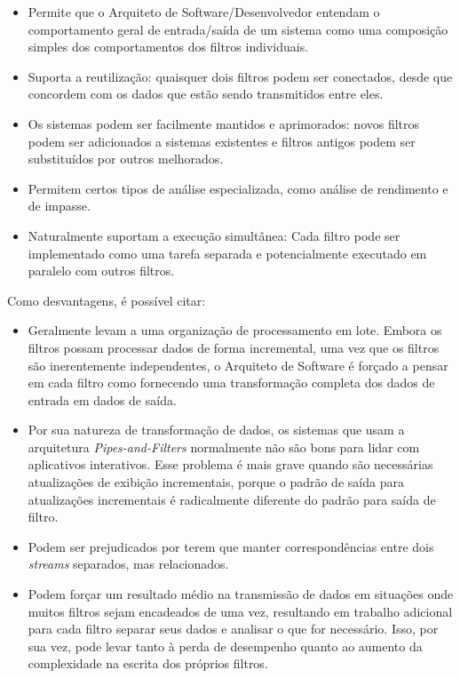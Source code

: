 \documentclass[portugues]{ic-tese}
\begin{document}
\begin{itemize}
\item Permite que o Arquiteto de Software/Desenvolvedor entendam o comportamento geral de entrada/saída de um sistema como uma composição simples dos comportamentos dos filtros individuais.
\item Suporta a reutilização: quaisquer dois filtros podem ser conectados, desde que concordem com os dados que estão sendo transmitidos entre eles. 
\item Os sistemas podem ser facilmente mantidos e aprimorados: novos filtros podem ser adicionados a sistemas existentes e filtros antigos podem ser substituídos por outros melhorados.
\item Permitem certos tipos de análise especializada, como análise de rendimento e de impasse.
\item Naturalmente suportam a execução simultânea: Cada filtro pode ser implementado como uma tarefa separada e potencialmente executado em paralelo com outros filtros.
\end{itemize}

Como desvantagens, é possível citar:

\begin{itemize}
\item Geralmente levam a uma organização de processamento em lote. Embora os filtros possam processar dados de forma incremental, uma vez que os filtros são inerentemente independentes, o Arquiteto de Software é forçado a pensar em cada filtro como fornecendo uma transformação completa dos dados de entrada em dados de saída. 
\item Por sua natureza de transformação de dados, os sistemas que usam a arquitetura \textit{Pipes-and-Filters} normalmente não são bons para lidar com aplicativos interativos. Esse problema é mais grave quando são necessárias atualizações de exibição incrementais, porque o padrão de saída para atualizações incrementais é radicalmente diferente do padrão para saída de filtro.
\item Podem ser prejudicados por terem que manter correspondências entre dois \textit{streams} separados, mas relacionados. 
\item Podem forçar um resultado médio na transmissão de dados em situações onde muitos filtros sejam encadeados de uma vez, resultando em trabalho adicional para cada filtro separar seus dados e analisar o que for necessário. Isso, por sua vez, pode levar tanto à perda de desempenho quanto ao aumento da complexidade na escrita dos próprios filtros.
\end{itemize}
\end{document}
